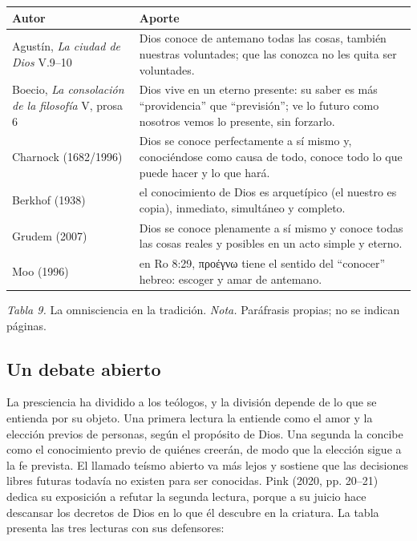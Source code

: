\documentclass[11pt,letterpaper]{article}
\newcommand{\grc}[1]{\foreignlanguage{ancientgreek}{#1}}
\begin{document}
\begin{center}\small\renewcommand{\arraystretch}{1.25}
\begin{tabular}{@{}L{3.6cm}L{10.8cm}@{}}
\toprule
\textbf{Autor} & \textbf{Aporte} \\ \midrule
Agustín, \emph{La ciudad de Dios} V.9--10 & Dios conoce de antemano todas las cosas, también nuestras voluntades; que las conozca no les quita ser voluntades. \\
Boecio, \emph{La consolación de la filosofía} V, prosa 6 & Dios vive en un eterno presente: su saber es más ``providencia'' que ``previsión''; ve lo futuro como nosotros vemos lo presente, sin forzarlo. \\
Charnock (1682/1996) & Dios se conoce perfectamente a sí mismo y, conociéndose como causa de todo, conoce todo lo que puede hacer y lo que hará. \\
Berkhof (1938) & el conocimiento de Dios es arquetípico (el nuestro es copia), inmediato, simultáneo y completo. \\
Grudem (2007) & Dios se conoce plenamente a sí mismo y conoce todas las cosas reales y posibles en un acto simple y eterno. \\
Moo (1996) & en Ro 8:29, \grc{προέγνω} tiene el sentido del ``conocer'' hebreo: escoger y amar de antemano. \\
\bottomrule
\end{tabular}\par
{\footnotesize\color{gris}\textit{Tabla 9.} La omnisciencia en la tradición. \textit{Nota.} Paráfrasis propias; no se indican páginas.}
\end{center}

\subsection{Un debate abierto}
La presciencia ha dividido a los teólogos, y la división depende de lo que se entienda por su objeto. Una primera lectura la entiende como el amor y la elección previos de personas, según el propósito de Dios. Una segunda la concibe como el conocimiento previo de quiénes creerán, de modo que la elección sigue a la fe prevista. El llamado teísmo abierto va más lejos y sostiene que las decisiones libres futuras todavía no existen para ser conocidas. Pink (2020, pp. 20--21) dedica su exposición a refutar la segunda lectura, porque a su juicio hace descansar los decretos de Dios en lo que él descubre en la criatura. La tabla presenta las tres lecturas con sus defensores:
\end{document}
